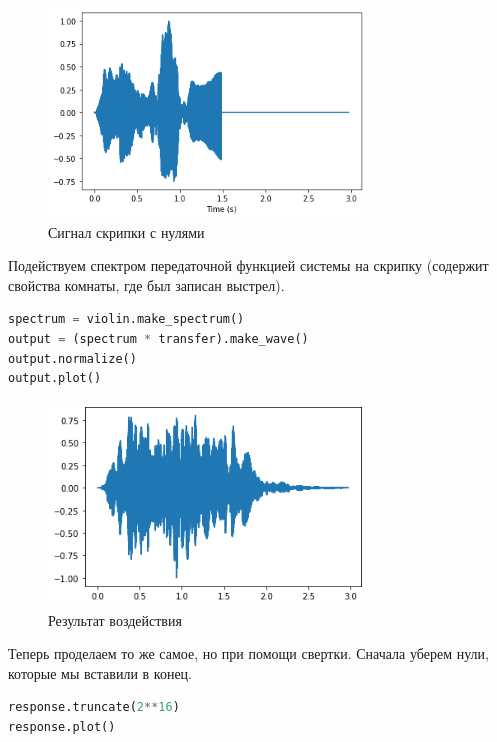 \documentclass[a4paper,12pt]{report}
\begin{document}
    \begin{figure}[H]
        \centering
        \includegraphics[width=0.75\textwidth]{images/ex1_violin_1.png}
        \caption{Сигнал скрипки с нулями}
        \label{fig:ex1_violin_1}
    \end{figure}
    
    Подействуем спектром передаточной функцией системы на скрипку (содержит свойства комнаты, где был записан выстрел).
    
\begin{lstlisting}[language=Python,caption=Перемножаем спектры]
spectrum = violin.make_spectrum()
output = (spectrum * transfer).make_wave()
output.normalize()
output.plot()
\end{lstlisting}

    \begin{figure}[H]
        \centering
        \includegraphics[width=0.75\textwidth]{images/ex1_violin_2.png}
        \caption{Результат воздействия}
        \label{fig:ex1_violin_2}
    \end{figure}
    
    Теперь проделаем то же самое, но при помощи свертки. Сначала уберем нули, которые мы вставили в конец.
    
\begin{lstlisting}[language=Python,caption=Убираем нули в звуке выстрела]
response.truncate(2**16)
response.plot()
\end{lstlisting}
\end{document}
